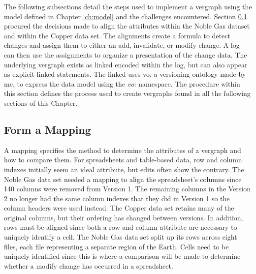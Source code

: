 The following subsections detail the steps used to implement a \gls{vergraph} using the model defined in Chapter \ref{ch:model} and the challenges encountered.
Section \ref{mapping} procured the decisions made to align the \glspl{attribute} within the Noble Gas dataset and within the Copper data set.
The alignments create a formula to detect changes and assign them to either an \gls{add}, \gls{invalidate}, or \gls{modify} \gls{change}.
A \gls{log} can then use the assignments to organize a presentation of the change data.
The underlying \gls{vergraph} exists as \gls{linked} encoded within the \gls{log}, but can also appear as explicit \gls{linked} statements.
The \gls{linked} uses \gls{vo}, a versioning ontology made by me, to express the data model using the \textit{vo:} namespace.
The procedure within this section defines the process used to create \glspl{vergraph} found in all the following sections of this Chapter.

\subsection{Form a Mapping} \label{mapping}

A mapping specifies the method to determine the \glspl{attribute} of a \gls{vergraph} and how to compare them.
For spreadsheets and table-based data, row and column indexes initially seem an ideal \gls{attribute}, but edits often show the contrary.
The Noble Gas data set needed a mapping to align the spreadsheet's columns since 140 columns were removed from Version 1.
The remaining columns in the Version 2 no longer had the same column indexes that they did in Version 1 so the column headers were used instead.
The Copper data set retains many of the original columns, but their ordering has changed between \glspl{version}.
In addition, rows must be aligned since both a row and column \gls{attribute} are necessary to uniquely identify a cell.
The Noble Gas data set split up its rows across eight files, each file representing a separate region of the Earth.
Cells need to be uniquely identified since this is where a comparison will be made to determine whether a \gls{modify} \gls{change} has occurred in a spreadsheet.


